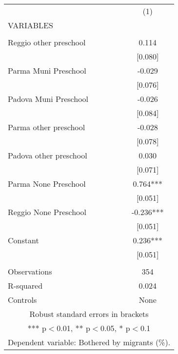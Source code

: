 \begin{tabular}{lc} \hline
 & (1) \\
VARIABLES &  \\ \hline
 &  \\
Reggio other preschool & 0.114 \\
 & [0.080] \\
Parma Muni Preschool & -0.029 \\
 & [0.076] \\
Padova Muni Preschool & -0.026 \\
 & [0.084] \\
Parma other preschool & -0.028 \\
 & [0.078] \\
Padova other preschool & 0.030 \\
 & [0.071] \\
Parma None Preschool & 0.764*** \\
 & [0.051] \\
Reggio None Preschool & -0.236*** \\
 & [0.051] \\
Constant & 0.236*** \\
 & [0.051] \\
 &  \\
Observations & 354 \\
R-squared & 0.024 \\
 Controls & None \\ \hline
\multicolumn{2}{c}{ Robust standard errors in brackets} \\
\multicolumn{2}{c}{ *** p$<$0.01, ** p$<$0.05, * p$<$0.1} \\
\multicolumn{2}{c}{ Dependent variable: Bothered by migrants (\%).} \\
\end{tabular}
